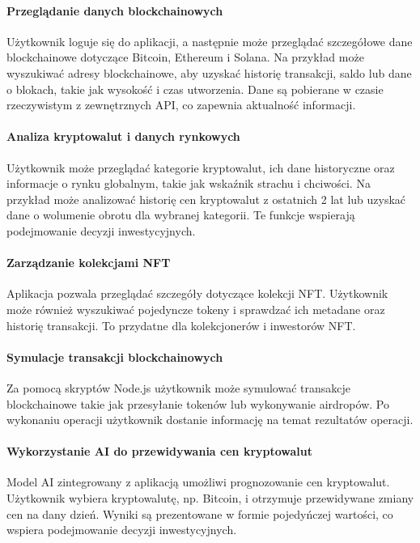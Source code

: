 \paragraph{Przeglądanie danych blockchainowych}
Użytkownik loguje się do aplikacji, a następnie może przeglądać szczegółowe dane blockchainowe dotyczące Bitcoin, Ethereum i Solana. Na przykład może wyszukiwać adresy blockchainowe, aby uzyskać historię transakcji, saldo lub dane o blokach, takie jak wysokość i czas utworzenia. Dane są pobierane w czasie rzeczywistym z zewnętrznych API, co zapewnia aktualność informacji.

\paragraph{Analiza kryptowalut i danych rynkowych}
Użytkownik może przeglądać kategorie kryptowalut, ich dane historyczne oraz informacje o rynku globalnym, takie jak wskaźnik strachu i chciwości. Na przykład może analizować historię cen kryptowalut z ostatnich 2 lat lub uzyskać dane o wolumenie obrotu dla wybranej kategorii. Te funkcje wspierają podejmowanie decyzji inwestycyjnych.

\paragraph{Zarządzanie kolekcjami NFT}
Aplikacja pozwala przeglądać szczegóły dotyczące kolekcji NFT. Użytkownik może również wyszukiwać pojedyncze tokeny i sprawdzać ich metadane oraz historię transakcji. To przydatne dla kolekcjonerów i inwestorów NFT.

\paragraph{Symulacje transakcji blockchainowych}
Za pomocą skryptów Node.js użytkownik może symulować transakcje blockchainowe takie jak przesyłanie tokenów lub wykonywanie airdropów. Po wykonaniu operacji użytkownik dostanie informację na temat rezultatów operacji.

\paragraph{Wykorzystanie AI do przewidywania cen kryptowalut}
Model AI zintegrowany z aplikacją umożliwi prognozowanie cen kryptowalut. Użytkownik wybiera kryptowalutę, np. Bitcoin, i otrzymuje przewidywane zmiany cen na dany dzień. Wyniki są prezentowane w formie pojedyńczej wartości, co wspiera podejmowanie decyzji inwestycyjnych.

